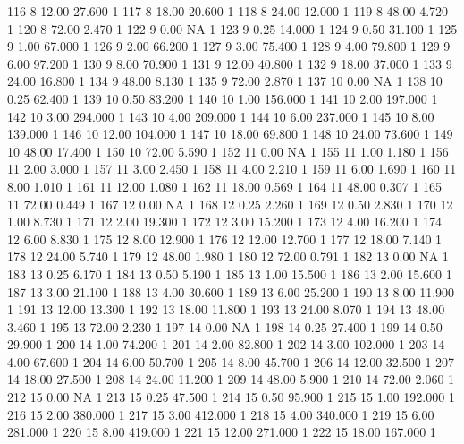 \begin{Schunk}
\begin{Soutput}
116    8 12.00  27.600   1
117    8 18.00  20.600   1
118    8 24.00  12.000   1
119    8 48.00   4.720   1
120    8 72.00   2.470   1
122    9  0.00      NA   1
123    9  0.25  14.000   1
124    9  0.50  31.100   1
125    9  1.00  67.000   1
126    9  2.00  66.200   1
127    9  3.00  75.400   1
128    9  4.00  79.800   1
129    9  6.00  97.200   1
130    9  8.00  70.900   1
131    9 12.00  40.800   1
132    9 18.00  37.000   1
133    9 24.00  16.800   1
134    9 48.00   8.130   1
135    9 72.00   2.870   1
137   10  0.00      NA   1
138   10  0.25  62.400   1
139   10  0.50  83.200   1
140   10  1.00 156.000   1
141   10  2.00 197.000   1
142   10  3.00 294.000   1
143   10  4.00 209.000   1
144   10  6.00 237.000   1
145   10  8.00 139.000   1
146   10 12.00 104.000   1
147   10 18.00  69.800   1
148   10 24.00  73.600   1
149   10 48.00  17.400   1
150   10 72.00   5.590   1
152   11  0.00      NA   1
155   11  1.00   1.180   1
156   11  2.00   3.000   1
157   11  3.00   2.450   1
158   11  4.00   2.210   1
159   11  6.00   1.690   1
160   11  8.00   1.010   1
161   11 12.00   1.080   1
162   11 18.00   0.569   1
164   11 48.00   0.307   1
165   11 72.00   0.449   1
167   12  0.00      NA   1
168   12  0.25   2.260   1
169   12  0.50   2.830   1
170   12  1.00   8.730   1
171   12  2.00  19.300   1
172   12  3.00  15.200   1
173   12  4.00  16.200   1
174   12  6.00   8.830   1
175   12  8.00  12.900   1
176   12 12.00  12.700   1
177   12 18.00   7.140   1
178   12 24.00   5.740   1
179   12 48.00   1.980   1
180   12 72.00   0.791   1
182   13  0.00      NA   1
183   13  0.25   6.170   1
184   13  0.50   5.190   1
185   13  1.00  15.500   1
186   13  2.00  15.600   1
187   13  3.00  21.100   1
188   13  4.00  30.600   1
189   13  6.00  25.200   1
190   13  8.00  11.900   1
191   13 12.00  13.300   1
192   13 18.00  11.800   1
193   13 24.00   8.070   1
194   13 48.00   3.460   1
195   13 72.00   2.230   1
197   14  0.00      NA   1
198   14  0.25  27.400   1
199   14  0.50  29.900   1
200   14  1.00  74.200   1
201   14  2.00  82.800   1
202   14  3.00 102.000   1
203   14  4.00  67.600   1
204   14  6.00  50.700   1
205   14  8.00  45.700   1
206   14 12.00  32.500   1
207   14 18.00  27.500   1
208   14 24.00  11.200   1
209   14 48.00   5.900   1
210   14 72.00   2.060   1
212   15  0.00      NA   1
213   15  0.25  47.500   1
214   15  0.50  95.900   1
215   15  1.00 192.000   1
216   15  2.00 380.000   1
217   15  3.00 412.000   1
218   15  4.00 340.000   1
219   15  6.00 281.000   1
220   15  8.00 419.000   1
221   15 12.00 271.000   1
222   15 18.00 167.000   1

\end{Soutput}
\end{Schunk}
